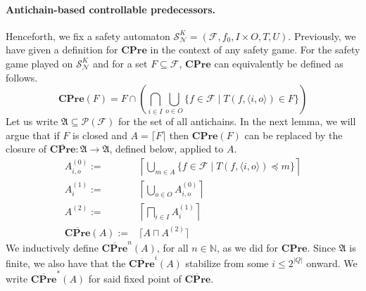 \documentclass[runningheads,a4paper,draft]{llncs}
\newcommand{\pow}[1]{\mathcal{P}(#1)}
\newcommand{\cpre}{\mathbf{CPre}}
\newcommand{\calF}{\mathcal{F}}
\newcommand{\calN}{\mathcal{N}}
\newcommand{\calS}{\mathcal{S}}
\newcommand{\frakA}{\mathfrak{A}}
\begin{document}
\paragraph{Antichain-based controllable predecessors.}
Henceforth, we fix a safety
automaton $\calS^K_\calN = (\calF,f_0,I \times O, T,U)$.  Previously, we have given a
definition for $\cpre$ in the context of any safety game. For the safety game
played on $\calS^K_\calN$ and for a set $F \subseteq \calF$, $\cpre$ can equivalently be
defined as follows.
\[
  \cpre(F) = F \cap \left( \bigcap_{i \in I} \bigcup_{o \in O}
  \{f \in \calF \mid T(f,\langle i, o \rangle) \in F\} \right)
\]
%
Let us write $\frakA \subseteq \pow{\calF}$ for the set of all antichains. In
the next lemma, we will argue that if $F$ is closed and $A = \lceil F \rceil$
then $\cpre(F)$ can be replaced by the closure of $\overline{\cpre} \colon
\frakA \to \frakA$, defined below, applied to $A$.
\begin{align*}
  A^{(0)}_{i,o} := {} &
  \left\lceil \bigcup_{m \in A} \{f \in \calF \mid T(f,\langle i, o \rangle)
  \preceq m \} \right\rceil\\
  A^{(1)}_{i} := {} &
  \left\lceil \bigcup_{o \in O} A^{(0)}_{i,o} \right\rceil\\
  A^{(2)} := {} &
  \left\lceil \bigsqcap_{i \in I} A^{(1)}_i \right\rceil\\
  \overline{\cpre}(A) := {} &
  \lceil A \sqcap A^{(2)} \rceil
\end{align*}
We inductively define $\overline{\cpre}^n(A)$, for all $n \in \mathbb{N}$, as
we did for $\cpre$. Since $\frakA$ is finite, we also have that the
$\overline{\cpre}^i(A)$ stabilize from some $i \leq 2^{|Q|}$ onward. We write
$\overline{\cpre}^*(A)$ for said fixed point of $\overline{\cpre}$.
\end{document}
